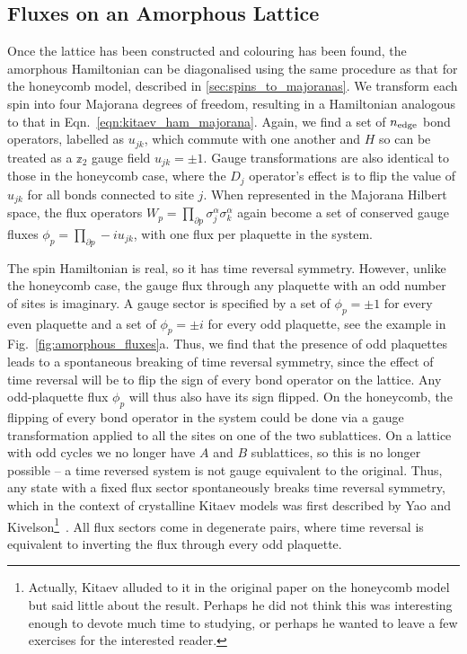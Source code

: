 \subsection{Fluxes on an Amorphous Lattice}
\label{sec:fluxes_amorphous}
Once the lattice has been constructed and colouring has been found, the amorphous Hamiltonian can be diagonalised using the same procedure as that for the honeycomb model, described in \textsection\ref{sec:spins_to_majoranas}. We transform each spin into four Majorana degrees of freedom, resulting in a Hamiltonian analogous to that in Eqn.~\ref{eqn:kitaev_ham_majorana}. Again, we find a set of $n_{\textup{edge}}$ bond operators, labelled as $u_{jk}$, which commute with one another and $H$ so can be treated as a $\mathbb z_2$ gauge field $u_{jk} = \pm 1$. Gauge transformations are also identical to those in the honeycomb case, where the $D_j$ operator's effect is to flip the value of $u_{jk}$ for all bonds connected to site $j$.  When represented in the Majorana Hilbert space, the flux operators $W_p = \prod_{\partial p}\sigma_{j}^\alpha\sigma_{k}^\alpha $ again become a set of conserved gauge fluxes $\phi_p = \prod_{\partial p}-iu_{jk}$, with one flux per plaquette in the system.

The spin Hamiltonian is real, so it has time reversal symmetry. However, unlike the honeycomb case, the gauge flux through any plaquette with an odd number of sites is imaginary. A gauge sector is specified by a set of $\phi_p = \pm 1$ for every even plaquette and a set of  $\phi_p = \pm i$ for every odd plaquette, see the example in Fig.~\ref{fig:amorphous_fluxes}a. Thus, we find that the presence of odd plaquettes leads to a spontaneous breaking of time reversal symmetry, since the effect of time reversal will be to flip the sign of every bond operator on the lattice. Any odd-plaquette flux $\phi_p$ will thus also have its sign flipped. On the honeycomb, the flipping of every bond operator in the system could be done via a gauge transformation applied to all the sites on one of the two sublattices. On a lattice with odd cycles we no longer have $A$ and $B$ sublattices, so this is no longer possible -- a time reversed system is not gauge equivalent to the original. Thus, any state with a fixed flux sector spontaneously breaks time reversal symmetry, which in the context of crystalline Kitaev models was first described by Yao and Kivelson\footnote{Actually, Kitaev alluded to it in the original paper on the honeycomb model but said little about the result. Perhaps he did not think this was interesting enough to devote much time to studying, or perhaps he wanted to leave a few exercises for the interested reader.}~\cite{yao_exact_2007}. All flux sectors come in degenerate pairs, where time reversal is equivalent to inverting the flux through every odd plaquette.

